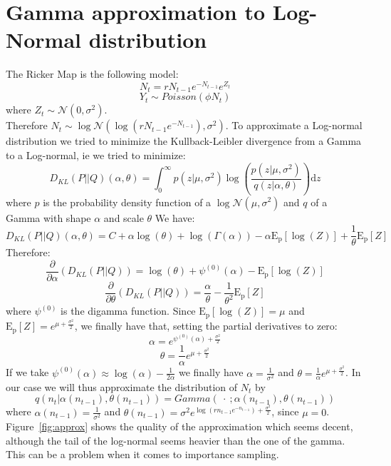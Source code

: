 \documentclass{article}
\begin{document}
\section*{Gamma approximation to Log-Normal distribution}
The Ricker Map is the following model:
\begin{equation*}
N_t = rN_{t-1}e^{-N_{t-1}}e^{Z_t}
\end{equation*}
\begin{equation*}
Y_t \sim Poisson(\phi N_t)
\end{equation*}
where $Z_t \sim \mathcal{N} (0,\sigma^2)$.\\
Therefore $N_t \sim \log\mathcal{N} (\log{(rN_{t-1}e^{-N_{t-1}})},\sigma^2)$. To approximate a Log-normal distribution we tried to minimize the Kullback-Leibler divergence from a Gamma to a Log-normal, ie we tried to minimize:
\begin{equation*}
D_{KL}(P||Q)(\alpha, \theta) = \int_{0}^{\infty}{p(z|\mu, \sigma^2)\log(\frac{p(z|\mu, \sigma^2)}{q(z|\alpha, \theta)})\mathrm{d}z}
\end{equation*}
where $p$ is the probability density function of a $\log\mathcal{N}(\mu, \sigma^2)$ and $q$ of a Gamma with shape $\alpha$ and scale $\theta$
We have:
\begin{equation*}
D_{KL}(P||Q)(\alpha, \theta) = C + \alpha\log(\theta) + \log(\Gamma(\alpha)) - \alpha\mathrm{E_p}[\log(Z)] + \frac{1}{\theta}\mathrm{E_p}[Z]
\end{equation*}
Therefore:
\begin{equation*}
\frac{\partial }{\partial \alpha}(D_{KL}(P||Q)) = \log(\theta) + \psi^{(0)}(\alpha)-\mathrm{E_p}[\log(Z)]
\end{equation*}
\begin{equation*}
\frac{\partial }{\partial \theta}(D_{KL}(P||Q)) = \frac{\alpha}{\theta} - \frac{1}{\theta^2}\mathrm{E_p}[Z]
\end{equation*}
where $\psi^{(0)}$ is the digamma function.
\clearpage
Since $\mathrm{E_p}[\log(Z)]=\mu$ and $\mathrm{E_p}[Z] = e^{\mu+\frac{\sigma^2}{2}}$, we finally have that, setting the partial derivatives to zero:
\begin{equation*}
\alpha=e^{\psi^{(0)}(\alpha)+\frac{\sigma^2}{2}}
\end{equation*}
\begin{equation*}
\theta=\frac{1}{\alpha}e^{\mu+\frac{\sigma^2}{2}}
\end{equation*}
If we take $\psi^{(0)}(\alpha) \approx \log(\alpha)-\frac{1}{2\alpha}$ we finally have $\alpha =\frac{1}{\sigma^2}$ and $\theta=\frac{1}{\alpha}e^{\mu+\frac{\sigma^2}{2}}$.
In our case we will thus approximate the distribution of $N_t$ by
\begin{equation*}
q(n_t|\alpha(n_{t-1}), \theta(n_{t-1})) = Gamma(\ \cdot \ ; \alpha(n_{t-1}), \theta(n_{t-1}) )
\end{equation*}
where $ \alpha(n_{t-1})= \frac{1}{\sigma^2}$ and $\theta(n_{t-1})=\sigma^2e^{\log(rn_{t-1}e^{-n_{t-1}})+\frac{\sigma^2}{2}}$, since $\mu = 0$.\\
Figure~\ref{fig:approx} shows the quality of the approximation which seems decent, although the tail of the log-normal seems heavier than the one of the gamma. This can be a problem when it comes to importance sampling.
\end{document}
